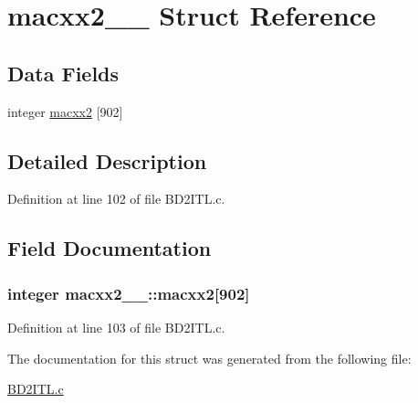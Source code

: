 \hypertarget{structmacxx2__1__}{}\section{macxx2\+\_\+\_\+ Struct Reference}
\label{structmacxx2__1__}
\subsection*{Data Fields}
\begin{DoxyCompactItemize}
\item 
integer \hyperlink{structmacxx2__1___ad50b2c2b3f465e6c4880073a06e98a69}{macxx2} \mbox{[}902\mbox{]}
\end{DoxyCompactItemize}


\subsection{Detailed Description}


Definition at line 102 of file B\+D2\+I\+T\+L.\+c.



\subsection{Field Documentation}
\subsubsection[{\texorpdfstring{macxx2}{macxx2}}]{\setlength{\rightskip}{0pt plus 5cm}integer macxx2\+\_\+\_\+\+::macxx2\mbox{[}902\mbox{]}}\hypertarget{structmacxx2__1___ad50b2c2b3f465e6c4880073a06e98a69}{}\label{structmacxx2__1___ad50b2c2b3f465e6c4880073a06e98a69}


Definition at line 103 of file B\+D2\+I\+T\+L.\+c.



The documentation for this struct was generated from the following file\+:\begin{DoxyCompactItemize}
\item 
\hyperlink{BD2ITL_8c}{B\+D2\+I\+T\+L.\+c}\end{DoxyCompactItemize}
